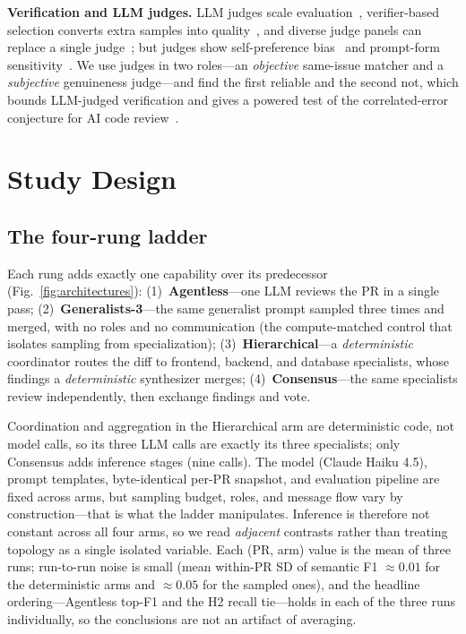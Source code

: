 \documentclass[conference]{IEEEtran}
\begin{document}
\textbf{Verification and LLM judges.} LLM judges scale
evaluation~\cite{llmjudge}, verifier-based selection converts extra samples into
quality~\cite{cobbe}, and diverse judge panels can replace a single
judge~\cite{verga}; but judges show self-preference bias~\cite{panickssery} and
prompt-form sensitivity~\cite{sclar}. We use judges in two roles---an
\emph{objective} same-issue matcher and a \emph{subjective} genuineness
judge---and find the first reliable and the second not, which bounds LLM-judged
verification and gives a powered test of the correlated-error conjecture for AI
code review~\cite{zietsman}.

\section{Study Design}

\subsection{The four-rung ladder}
\label{sec:variables}
Each rung adds exactly one capability over its predecessor
(Fig.~\ref{fig:architectures}): (1)~\textbf{Agentless}---one LLM reviews the PR
in a single pass; (2)~\textbf{Generalists-3}---the same generalist prompt sampled
three times and merged, with no roles and no communication (the compute-matched
control that isolates sampling from specialization); (3)~\textbf{Hierarchical}---a
\emph{deterministic} coordinator routes the diff to frontend, backend, and
database specialists, whose findings a \emph{deterministic} synthesizer merges;
(4)~\textbf{Consensus}---the same specialists review independently, then exchange
findings and vote.

Coordination and aggregation in the Hierarchical arm are deterministic code, not
model calls, so its three LLM calls are exactly its three specialists; only
Consensus adds inference stages (nine calls). The model (Claude Haiku 4.5),
prompt templates, byte-identical per-PR snapshot, and evaluation pipeline are
fixed across arms, but sampling budget, roles, and message flow vary by
construction---that is what the ladder manipulates. Inference is therefore not
constant across all four arms, so we read \emph{adjacent} contrasts rather than
treating topology as a single isolated variable. Each (PR, arm) value is the mean
of three runs; run-to-run noise is small (mean within-PR SD of semantic F1
${\approx}0.01$ for the deterministic arms and ${\approx}0.05$ for the sampled
ones), and the headline ordering---Agentless top-F1 and the H2 recall tie---holds
in each of the three runs individually, so the conclusions are not an artifact of
averaging.
\end{document}

